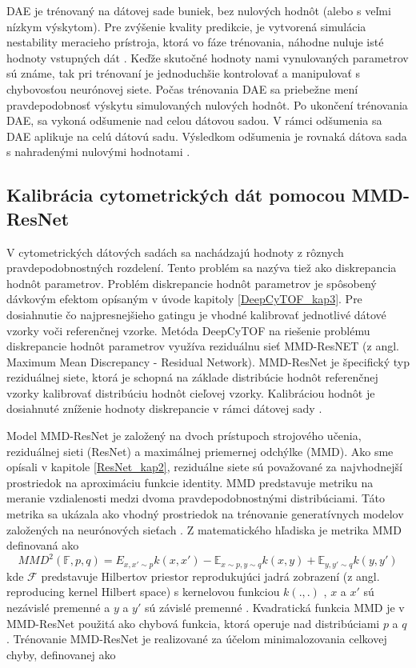 DAE je trénovaný na dátovej sade buniek, bez nulových hodnôt (alebo s veľmi nízkym výskytom). Pre zvýšenie kvality predikcie, je vytvorená simulácia nestability meracieho prístroja, ktorá vo fáze trénovania, náhodne nuluje isté hodnoty vstupných dát \cite{Li2017}. Keďže skutočné hodnoty nami vynulovaných parametrov sú známe, tak pri trénovaní je jednoduchšie kontrolovať a manipulovať s chybovosťou neurónovej siete. Počas trénovania DAE sa priebežne mení pravdepodobnosť výskytu simulovaných nulových hodnôt. Po ukončení trénovania DAE, sa vykoná odšumenie nad celou dátovou sadou. V rámci odšumenia sa DAE aplikuje na celú dátovú sadu. Výsledkom odšumenia je rovnaká dátova sada s nahradenými nulovými hodnotami \cite{Li2017}.

\subsection{Kalibrácia cytometrických dát pomocou MMD-ResNet}

V cytometrických dátových sadách sa nachádzajú hodnoty z rôznych pravdepodobnostných rozdelení. Tento problém sa nazýva tiež ako diskrepancia hodnôt parametrov. Problém diskrepancie hodnôt parametrov je spôsobený dávkovým efektom opísaným v úvode kapitoly \ref{DeepCyTOF_kap3}.
Pre dosiahnutie čo najpresnejšieho gatingu je vhodné kalibrovať jednotlivé dátové vzorky voči referenčnej vzorke. Metóda DeepCyTOF na riešenie problému diskrepancie hodnôt parametrov využíva reziduálnu sieť MMD-ResNET (z angl. Maximum Mean Discrepancy - Residual Network). MMD-ResNet je špecifický typ reziduálnej siete, ktorá je schopná na základe distribúcie hodnôt referenčnej vzorky kalibrovať distribúciu hodnôt cieľovej vzorky. Kalibráciou hodnôt je dosiahnuté zníženie hodnoty diskrepancie v rámci dátovej sady \cite{Li2017}.

Model MMD-ResNet je založený na dvoch prístupoch strojového učenia, reziduálnej sieti (ResNet) a maximálnej priemernej odchýlke (MMD). Ako sme opísali v kapitole \ref{ResNet_kap2}, reziduálne siete sú považované za najvhodnejší prostriedok na aproximáciu funkcie identity. MMD predstavuje metriku na meranie vzdialenosti medzi dvoma pravdepodobnostnými distribúciami. Táto metrika sa ukázala ako vhodný prostriedok na trénovanie generatívnych modelov založených na neurónových sieťach \cite{Li2017, Li2016, He2016, Wu2017}. Z matematického hľadiska je metrika MMD definovaná ako
\begin{equation}
    MMD^2 (\mathbb{F},p,q)=\mathrm{}{E}_{x,x'\sim p}k(x,x') - \mathbb{E}_{x\sim p,y\sim q}k(x,y) + \mathbb{E}_{y,y'\sim q}k(y,y')
\end{equation}
kde $\mathcal{F}$ predstavuje Hilbertov priestor \cite{HilbSpace, Alvarez2012} reprodukujúci jadrá zobrazení (z angl. reproducing kernel Hilbert space) s kernelovou funkciou $k(.,.)$ \cite{Alvarez2012}, $x$ a $x'$ sú nezávislé premenné a $y$ a $y'$ sú závislé premenné \cite{Li2017}. Kvadratická funkcia MMD je v MMD-ResNet použitá ako chybová funkcia, ktorá operuje nad distribúciami $p$ a $q$ \cite{Li2017}. Trénovanie MMD-ResNet je realizované za účelom minimalozovania celkovej chyby, definovanej ako

